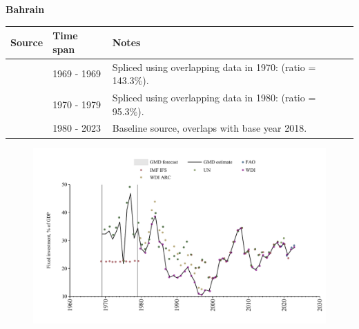 \documentclass[12pt,a4paper,landscape]{article}
\begin{document}
\begin{adjustbox}{max totalsize={\paperwidth}{\paperheight},center}
\begin{minipage}[t][\textheight][t]{\textwidth}
\vspace*{0.5cm}
{}
\begin{center}
{\Large\bfseries Bahrain}
\end{center}
\vspace{0.5cm}
\begin{table}[H]
\centering
\small
\begin{tabular}{|l|l|l|}
\hline
\textbf{Source} & \textbf{Time span} & \textbf{Notes} \\
\hline
\rowcolor{white}\cite{IMF_IFS}& 1969 - 1969 &Spliced using overlapping data in 1970: (ratio = 143.3\%).\\
\rowcolor{lightgray}\cite{UN}& 1970 - 1979 &Spliced using overlapping data in 1980: (ratio = 95.3\%).\\
\rowcolor{white}\cite{WDI}& 1980 - 2023 &Baseline source, overlaps with base year 2018.\\
\hline
\end{tabular}
\end{table}
\begin{figure}[H]
\centering
\includegraphics[width=\textwidth,height=0.6\textheight,keepaspectratio]{graphs/BHR_finv_GDP.pdf}
\end{figure}
\end{minipage}
\end{adjustbox}
\end{document}
